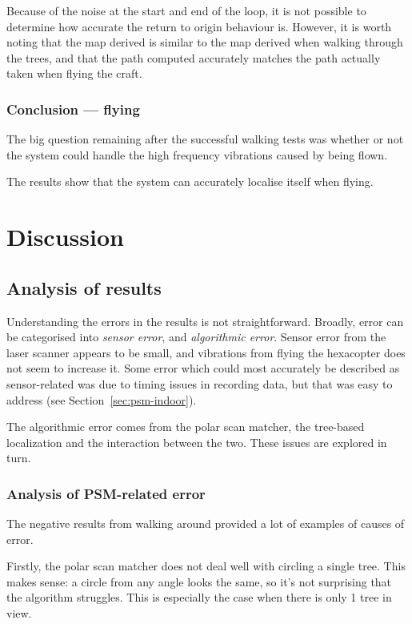 \documentclass[12pt,oneside,a4paper]{book}
\begin{document}
Because of the noise at the start and end of the loop, it is not
possible to determine how accurate the return to origin behaviour
is. However, it is worth noting that the map derived is similar to the
map derived when walking through the trees, and that the path computed
accurately matches the path actually taken when flying the craft.
\newpage
\subsection{Conclusion --- flying}
\label{sec:conclusion-flying}

The big question remaining after the successful walking tests was
whether or not the system could handle the high frequency vibrations
caused by being flown. 

The results show that the system can accurately localise itself when
flying. 

\chapter{Discussion}
\label{cha:discussion}

\section{Analysis of results}
\label{sec:analysis-results}

Understanding the errors in the results is not
straightforward. Broadly, error can be categorised into \emph{sensor
  error}, and \emph{algorithmic error}. Sensor error from the laser
scanner appears to be small, and vibrations from flying the hexacopter
does not seem to increase it. Some error which could most accurately
be described as sensor-related was due to timing issues in recording
data, but that was easy to address (see Section~\ref{sec:psm-indoor}).

The algorithmic error comes from the polar scan matcher, the
tree-based localization and the interaction between the two. These
issues are explored in turn.

\subsection{Analysis of PSM-related error}
\label{sec:psm-error}

The negative results from walking around provided a lot of examples of
causes of error.

Firstly, the polar scan matcher does not deal well with circling a
single tree. This makes sense: a circle from any angle looks the same,
so it's not surprising that the algorithm struggles. This is
especially the case when there is only 1 tree in view.
\end{document}
